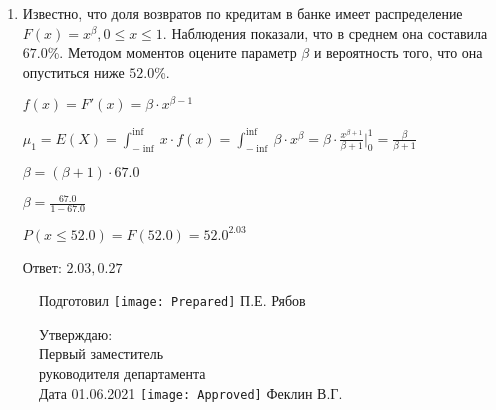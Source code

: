 \documentclass[a4paper,14pt]{article}
\begin{document}
\begin{enumerate}
\item

    
	Известно, что доля возвратов по кредитам в банке имеет распределение $F(x) = x^{\beta}, 0 \le x \le 1$. Наблюдения показали, что в среднем она составила $67.0$\%. Методом моментов оцените параметр $\beta$ и вероятность того, что она опуститься ниже $52.0$\%.
	


	

	$f(x) = F'(x) = \beta \cdot x^{\beta - 1}$

	$\mu_{1} = E(X) = \int_{-\inf}^{\inf}x \cdot f(x) = \int_{-\inf}^{\inf} \beta \cdot x^{\beta} = \beta \cdot \frac{x^{\beta + 1}}{\beta + 1}\bigg|_0^1 = \frac{\beta}{\beta + 1}$

	$\beta = (\beta + 1) \cdot 67.0$

	$\beta = \frac{67.0}{1 - 67.0}$

	$ P(x \le 52.0) = F(52.0) = 52.0^{2.03} $

    Ответ: $2.03, 0.27$
	

\end{enumerate}

\begin{figure}[H]
	Подготовил
	\hfill
	\texttt{[image: Prepared]}
	П.Е. Рябов
\end{figure}


\begin{figure}[H]
	Утверждаю:\\
	Первый заместитель\\
	руководителя департамента\\
	Дата 01.06.2021
	\hfill
	\texttt{[image: Approved]}
	Феклин В.Г.
\end{figure}
\end{document}

